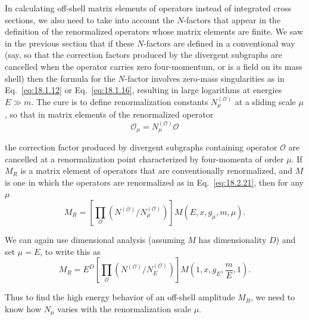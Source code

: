 In calculating off-shell matrix elements of operators instead of integrated
cross sections, we also need to take into account the $N$-factors that appear
in the definition of the renormalized operators whose matrix elements are
finite. We saw in the previous section that if these $N$-factors are defined
in a conventional way (say, so that the correction factors produced by the
divergent subgraphs are cancelled when the operator carries zero
four-momentum, or is a field on its mass shell) then the formula for the
$N$-factor involves zero-mass singularities as in Eq.~\eqref{eq:18.1.12} or
Eq.~\eqref{eq:18.1.16}, resulting in large logarithms at energies $E\gg m$.
The cure is to define renormalization constants $N_\mu^{(\mathcal O)}$ at a
sliding scale $\mu$, so that in matrix elements of the renormalized operator
\begin{equation}
\mathcal O_\mu=N_\mu^{(\mathcal O)}\mathcal O
\tag{18.2.21}\label{eq:18.2.21}
\end{equation}
\par\noindent
the correction factor produced by divergent subgraphs containing operator
$\mathcal O$ are cancelled at a renormalization point characterized by
four-momenta of order $\mu$. If $M_R$ is a matrix element of operators that
are conventionally renormalized, and $M$ is one in which the operators are
renormalized as in Eq.~\eqref{eq:18.2.21}, then for any $\mu$
\begin{equation}
M_R=\left[\prod_{\mathcal O}
\left(N^{(\mathcal O)}/N_\mu^{(\mathcal O)}\right)\right]
M(E,x,g_\mu,m,\mu).
\tag{18.2.22}\label{eq:18.2.22}
\end{equation}
\par\noindent
We can again use dimensional analysis (assuming $M$ has dimensionality $D$)
and set $\mu=E$, to write this as
\begin{equation}
M_R=E^D\left[\prod_{\mathcal O}
\left(N^{(\mathcal O)}/N_E^{(\mathcal O)}\right)\right]
M\left(1,x,g_E,\frac{m}{E},1\right).
\tag{18.2.23}\label{eq:18.2.23}
\end{equation}
\par\noindent
Thus to find the high energy behavior of an off-shell amplitude $M_R$, we need
to know how $N_\mu$ varies with the renormalization scale $\mu$.


